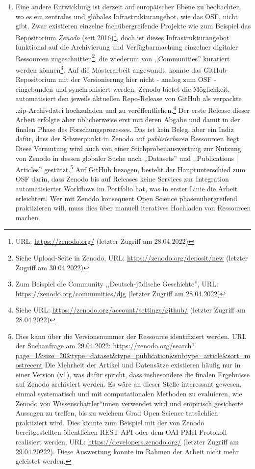 \begin{enumerate}
\item Eine andere Entwicklung ist derzeit auf europäischer Ebene zu beobachten, wo es ein zentrales und globales Infrastrukturangebot, wie das OSF, nicht gibt. Zwar existieren einzelne fachübergreifende Projekte wie zum Beispiel das Repositorium \textit{Zenodo} (seit 2016)\footnote{URL: \url{https://zenodo.org/} (letzter Zugriff am 28.04.2022)}, doch ist dieses Infrastrukturangebot funktional auf die Archivierung und Verfügbarmachung einzelner digitaler Ressourcen zugeschnitten\footnote{Siehe Upload-Seite in Zenodo, URL: \url{https://zenodo.org/deposit/new} (letzter Zugriff am 30.04.2022)}, die wiederum von ,,Communities'' kuratiert werden können\footnote{Zum Beispiel die Community ,,Deutsch-jüdische Geschichte'', URL: \url{https://zenodo.org/communities/djg} (letzter Zugriff am 28.04.2022)}. Auf die Masterarbeit angewandt, konnte das GitHub-Repositorium mit der Versionierung hier nicht - analog zum OSF - eingebunden und synchronisiert werden. Zenodo bietet die Möglichkeit, automatisiert den jeweils aktuellen Repo-Release von GitHub als verpackte .zip-Archivdatei hochzuladen und zu veröffentlichen.\footnote{Siehe URL: \url{https://zenodo.org/account/settings/github/} (letzter Zugriff am 28.04.2022)} Der erste Release dieser Arbeit erfolgte aber üblicherweise erst mit deren Abgabe und damit in der finalen Phase des Forschungsprozesses. Das ist kein Beleg, aber ein Indiz dafür, dass der Schwerpunkt in Zenodo auf \textit{publizierbaren} Ressourcen liegt. Diese Vermutung wird auch von einer Stichprobenauswertung zur Nutzung von Zenodo in dessen globaler Suche nach ,,Datasets'' und ,,Publications | Articles'' gestützt.\footnote{Dies kann über die Versionsnummer der Ressource identifiziert werden. URL der Suchanfrage am 29.04.2022: \url{https://zenodo.org/search?page=1&size=20&type=dataset&type=publication&subtype=article&sort=mostrecent} Die Mehrheit der Artikel und Datensätze existieren häufig nur in einer Version (v1), was dafür spricht, dass insbesondere die finalen Ergebnisse auf Zenodo archiviert werden. Es wäre an dieser Stelle interessant gewesen, einmal systematisch und mit computationalen Methoden zu evaluieren, wie Zenodo von Wissenschaftler*innen verwendet wird und empirisch gesicherte Aussagen zu treffen, bis zu welchem Grad Open Science tatsächlich praktiziert wird. Dies könnte zum Beispiel mit der von Zenodo bereitgestellten öffentlichen REST-API oder dem OAI-PMH Protokoll realisiert werden, URL: \url{https://developers.zenodo.org/} (letzter Zugriff am 29.04.20222). Diese Auswertung konnte im Rahmen der Arbeit nicht mehr geleistet werden.} Auf GitHub bezogen, besteht der Hauptunterschied zum OSF darin, dass Zenodo bis auf Releases keine Services zur Integration automatisierter Workflows im Portfolio hat, was in erster Linie die Arbeit erleichtert. Wer mit Zenodo konsequent Open Science phasenübergreifend praktizieren will, muss dies über manuell iteratives Hochladen von Ressourcen machen. 


\end{enumerate}
